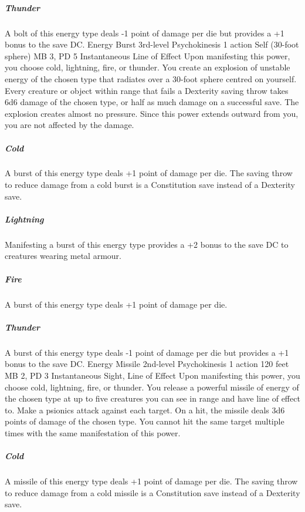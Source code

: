 \subparagraph{Thunder} A bolt of this energy type deals -1 point
of damage per die but provides a +1 bonus to the save DC.
\DndPowerHeader%
    {Energy Burst\label{pwr:energy-burst}}
    {3rd-level Psychokinesis}
    {1 action}
    {Self (30-foot sphere)}
    {MB 3, PD 5}
    {Instantaneous}
    {Line of Effect}
Upon manifesting this power, you choose cold,
lightning, fire, or thunder. You create an explosion of unstable
energy of the chosen type that radiates over a 30-foot sphere
centred on yourself. Every creature or object within range
that fails a Dexterity saving throw takes 6d6 damage of the
chosen type, or half as much damage on a successful save.
The explosion creates almost no pressure. Since this power
extends outward from you, you are not affected by the damage.

\subparagraph{Cold} A burst of this energy type deals +1 point
of damage per die. The saving throw to reduce damage from
a cold burst is a Constitution save instead of a Dexterity
save.

\subparagraph{Lightning} Manifesting a burst of this energy
type provides a +2 bonus to the save DC to creatures wearing
metal armour.

\subparagraph{Fire} A burst of this energy type deals +1 point
of damage per die.

\subparagraph{Thunder} A burst of this energy type deals -1
point of damage per die but provides a +1 bonus to the save
DC.
\DndPowerHeader%
    {Energy Missile\label{pwr:energy-missile}}
    {2nd-level Psychokinesis}
    {1 action}
    {120 feet}
    {MB 2, PD 3}
    {Instantaneous}
    {Sight, Line of Effect}
Upon manifesting this power, you choose cold,
lightning, fire, or thunder. You release a powerful missile
of energy of the chosen type at up to five creatures you can
see in range and have line of effect to. Make a psionics attack
against each target. On a hit, the missile deals 3d6 points
of damage of the chosen type. You cannot hit the same target
multiple times with the same manifestation of this power.

\subparagraph{Cold} A missile of this energy type deals +1
point of damage per die. The saving throw to reduce damage
from a cold missile is a Constitution save instead of a Dexterity
save.

